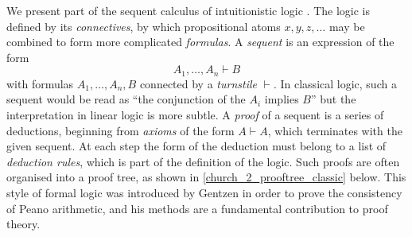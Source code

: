 \documentclass[english,letter paper,12pt,reqno]{article}
\theoremstyle{example}
\numberwithin{equation}{section}
\begin{document}
We present part of the sequent calculus of intuitionistic logic \cite{gentzen}. The logic is defined by its \emph{connectives}, by which propositional atoms $x,y,z,\ldots$ may be combined to form more complicated \emph{formulas}. A \emph{sequent} is an expression of the form
\[
A_1,\ldots,A_n \vdash B
\]
with formulas $A_1,\ldots,A_n, B$ connected by a \emph{turnstile} $\vdash$. In classical logic, such a sequent would be read as ``the conjunction of the $A_i$ implies $B$'' but the interpretation in linear logic is more subtle. A \emph{proof} of a sequent is a series of deductions, beginning from \emph{axioms} of the form $A \vdash A$, which terminates with the given sequent. At each step the form of the deduction must belong to a list of \emph{deduction rules}, which is part of the definition of the logic. Such proofs are often organised into a proof tree, as shown in \eqref{church_2_prooftree_classic} below. This style of formal logic was introduced by Gentzen \cite{gentzen} in order to prove the consistency of Peano arithmetic, and his methods are a fundamental contribution to proof theory.
\end{document}
